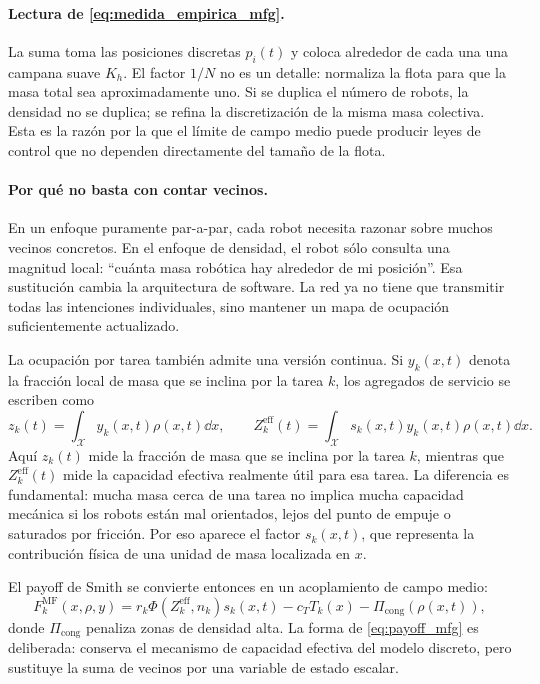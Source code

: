 \paragraph{Lectura de \eqref{eq:medida_empirica_mfg}.}
La suma toma las posiciones discretas $p_i(t)$ y coloca alrededor de cada una una
campana suave $K_h$. El factor $1/N$ no es un detalle: normaliza la flota para que la
masa total sea aproximadamente uno. Si se duplica el número de robots, la densidad no se
duplica; se refina la discretización de la misma masa colectiva. Esta es la razón por la
que el límite de campo medio puede producir leyes de control que no dependen
directamente del tamaño de la flota.

\paragraph{Por qué no basta con contar vecinos.}
En un enfoque puramente par-a-par, cada robot necesita razonar sobre muchos vecinos
concretos. En el enfoque de densidad, el robot sólo consulta una magnitud local:
``cuánta masa robótica hay alrededor de mi posición''. Esa sustitución cambia la
arquitectura de software. La red ya no tiene que transmitir todas las intenciones
individuales, sino mantener un mapa de ocupación suficientemente actualizado.

La ocupación por tarea también admite una versión continua. Si $y_k(x,t)$ denota la
fracción local de masa que se inclina por la tarea $k$, los agregados de servicio se
escriben como
\begin{equation}
  z_k(t)=\int_{\mathcal X}y_k(x,t)\rho(x,t)\dd x,
  \qquad
  Z_k^{\mathrm{eff}}(t)=
  \int_{\mathcal X}s_k(x,t)y_k(x,t)\rho(x,t)\dd x .
  \label{eq:agregados_mfg}
\end{equation}
Aquí $z_k(t)$ mide la fracción de masa que se inclina por la tarea $k$, mientras que
$Z_k^{\mathrm{eff}}(t)$ mide la capacidad efectiva realmente útil para esa tarea. La
diferencia es fundamental: mucha masa cerca de una tarea no implica mucha capacidad
mecánica si los robots están mal orientados, lejos del punto de empuje o saturados por
fricción. Por eso aparece el factor $s_k(x,t)$, que representa la contribución física de
una unidad de masa localizada en $x$.

El payoff de Smith se convierte entonces en un acoplamiento de campo medio:
\begin{equation}
  F_k^{\mathrm{MF}}(x,\rho,y)
  =
  r_k\Phi\!\left(Z_k^{\mathrm{eff}},n_k\right)s_k(x,t)
  -c_TT_k(x)
  -\Pi_{\mathrm{cong}}(\rho(x,t)),
  \label{eq:payoff_mfg}
\end{equation}
donde $\Pi_{\mathrm{cong}}$ penaliza zonas de densidad alta. La forma de
\eqref{eq:payoff_mfg} es deliberada: conserva el mecanismo de capacidad efectiva del
modelo discreto, pero sustituye la suma de vecinos por una variable de estado escalar.

